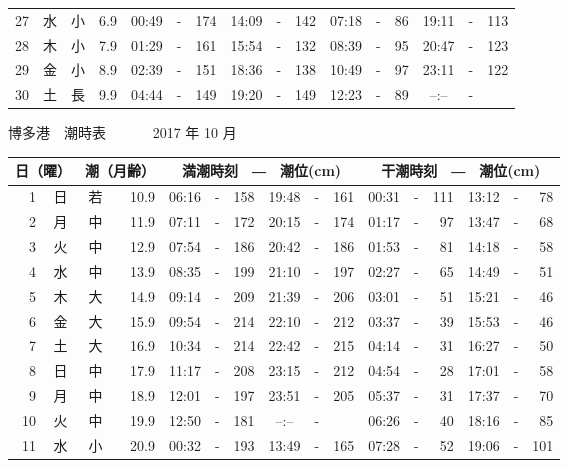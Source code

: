 \documentclass[12pt.a4j]{jsarticle}
\begin{document}
\begin{center}
\begin{table}[ht]
\begin{tabular}{|rc|cr|ccrccr|ccrccr|}
27 & 水 & 小 &  6.9 &  00:49 &-& 174  &  14:09 &-& 142  &   07:18 &-&  86  &   19:11 &-& 113  \\
28 & 木 & 小 &  7.9 &  01:29 &-& 161  &  15:54 &-& 132  &   08:39 &-&  95  &   20:47 &-& 123  \\
29 & 金 & 小 &  8.9 &  02:39 &-& 151  &  18:36 &-& 138  &   10:49 &-&  97  &   23:11 &-& 122  \\
30 & 土 & 長 &  9.9 &  04:44 &-& 149  &  19:20 &-& 149  &   12:23 &-&  89  &   --:-- &-&     \\
   \hline
   \end{tabular}
\end{table}
\newpage
 {\LARGE 博多港　潮時表　　　}
 {\large 2017 年 10 月}\\
 \begin{table}[ht]
    \begin{tabular}{|rc|cr|ccrccr|ccrccr|}
    \hline
    \multicolumn{2}{|c|}{日（曜）} & \multicolumn{2}{c|}{潮（月齢）} & \multicolumn{6}{c|}{満潮時刻　―　潮位(cm)} & \multicolumn{6}{c|}{干潮時刻　―　潮位(cm)} \\
 \hline
 1 & 日 & 若 & 10.9 &  06:16 &-& 158  &  19:48 &-& 161  &   00:31 &-& 111  &   13:12 &-&  78  \\
 2 & 月 & 中 & 11.9 &  07:11 &-& 172  &  20:15 &-& 174  &   01:17 &-&  97  &   13:47 &-&  68  \\
 3 & 火 & 中 & 12.9 &  07:54 &-& 186  &  20:42 &-& 186  &   01:53 &-&  81  &   14:18 &-&  58  \\
 4 & 水 & 中 & 13.9 &  08:35 &-& 199  &  21:10 &-& 197  &   02:27 &-&  65  &   14:49 &-&  51  \\
 5 & 木 & 大 & 14.9 &  09:14 &-& 209  &  21:39 &-& 206  &   03:01 &-&  51  &   15:21 &-&  46  \\
 6 & 金 & 大 & 15.9 &  09:54 &-& 214  &  22:10 &-& 212  &   03:37 &-&  39  &   15:53 &-&  46  \\
 7 & 土 & 大 & 16.9 &  10:34 &-& 214  &  22:42 &-& 215  &   04:14 &-&  31  &   16:27 &-&  50  \\
 8 & 日 & 中 & 17.9 &  11:17 &-& 208  &  23:15 &-& 212  &   04:54 &-&  28  &   17:01 &-&  58  \\
 9 & 月 & 中 & 18.9 &  12:01 &-& 197  &  23:51 &-& 205  &   05:37 &-&  31  &   17:37 &-&  70  \\
10 & 火 & 中 & 19.9 &  12:50 &-& 181  &  --:-- &-&     &   06:26 &-&  40  &   18:16 &-&  85  \\
11 & 水 & 小 & 20.9 &  00:32 &-& 193  &  13:49 &-& 165  &   07:28 &-&  52  &   19:06 &-& 101  \\

\end{tabular}
\end{table}
\end{center}
\end{document}
